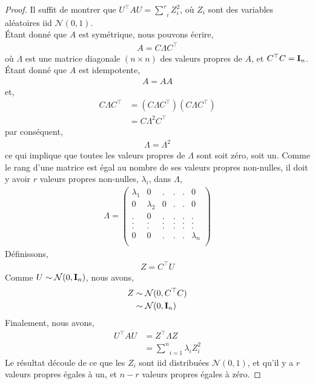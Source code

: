 \begin{proof}
Il suffit de montrer que $U^\top A U = \underset{i}{\overset{r}{\sum}} Z_i^2$, où $Z_i$ sont des variables aléatoires iid $\mathcal{N}(0,1)$.\\
\'Etant donné que $A$ est symétrique, nous pouvons écrire,
\begin{align*}
A = C\Lambda C^\top
\end{align*}
où $\Lambda $ est une matrice diagonale $(n\times n)$ des valeurs propres de $A$, et $C^\top C=\mathbf{I}_n$. \'Etant donné que $A$ est idempotente,
\begin{align*}
A = AA
\end{align*}
et,
\begin{align*}
 C\Lambda C^\top &= ( C\Lambda C^\top)( C\Lambda C^\top)\\
 &=C\Lambda^2C^\top
\end{align*}
par conséquent,
\begin{align*}
\Lambda=\Lambda^2
\end{align*}
ce qui implique que toutes les valeurs propres de $\Lambda$ sont soit zéro, soit un. Comme le rang d'une matrice est égal au nombre de ses valeurs propres non-nulles, il doit y avoir $r$ valeurs propres non-nulles, $\lambda_i$, dans $\Lambda$,
\begin{align*}
\Lambda=
\left(
\begin{array}{cccccc}
\lambda_1&0&.&.&.&0\\
0&\lambda_2&0&.&.&0\\
.&0&.&.&.&.\\
.&.&.&.&.&.\\
.&.&.&.&.&.\\
0&0&.&.&.&\lambda_n\\
\end{array}
\right)
\end{align*}
Définissons,
\begin{align*}
Z = C^\top U
\end{align*}
Comme $U\sim\mathcal{N}(0, \mathbf{I}_n)$, nous avons,
\begin{align*}
Z &\sim  \mathcal{N}(0, C^\top C)\\
&\sim  \mathcal{N}(0, \mathbf{I}_n)
\end{align*}
Finalement, nous avons,
\begin{align*}
U^\top AU &= Z^\top\Lambda Z\\
&=\underset{i=1}{\overset{n}{\sum}} \lambda_iZ_i^2
\end{align*}
Le résultat découle de ce que les $Z_i$ sont iid distribuées $\mathcal{N}(0,1)$, et qu'il y a $r$ valeurs propres égales à un, et $n-r$ valeurs propres égales à zéro.
\end{proof}
